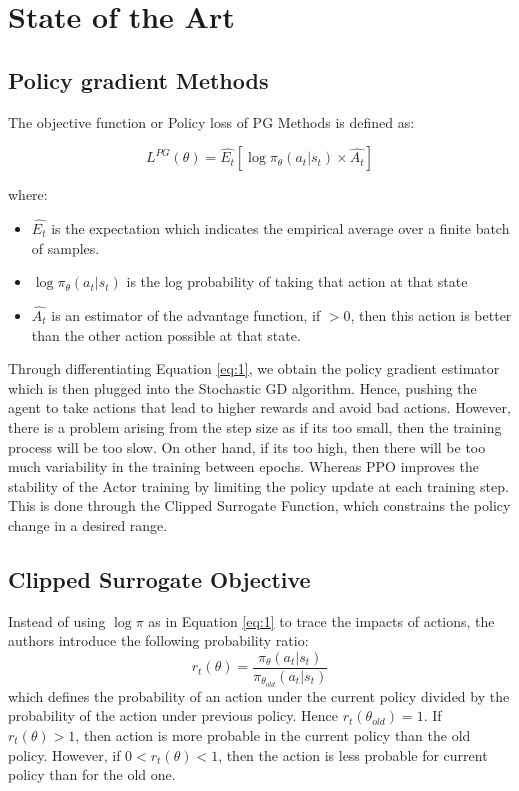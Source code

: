 \documentclass[12pt,a4paper]{article}
\begin{document}
\section{State of the Art}

\subsection{Policy gradient Methods}
The objective function or Policy loss of PG Methods is defined as: 


\begin{equation}
L^{PG}(\theta) =\hat{E_{t}} [\log \pi_{\theta} (a_t|s_t) \times \hat{{A_t}}  ] 
\end{equation}\label{eq:1}


where:
\begin{itemize}
\item  $\hat{{E_t}}$ is the expectation which indicates the empirical average over a finite batch of samples.
\item $\log \pi_{\theta} (a_t|s_t)$ is the log probability of taking that action at that state 
\item $\hat{{A_t}}$ is an estimator of the advantage function, if $>0$, then this action is better than the other action possible at that state.
\end{itemize}
Through differentiating Equation \ref{eq:1}, we obtain the policy gradient estimator which is then plugged into the Stochastic GD algorithm. Hence, pushing the agent to take actions that lead to higher rewards and avoid bad actions. However, there is a problem arising from the step size as if its too small, then the training process will be too slow. On other hand, if its too high, then there will be too much variability in the training between epochs.
Whereas PPO improves the stability of the Actor training by limiting the policy update at each training step. This is done through the Clipped Surrogate Function, which constrains the policy change in a desired range.

\subsection{Clipped Surrogate Objective}
Instead of using $\log \pi$ as in Equation \ref{eq:1} to trace the impacts of actions, the authors introduce the following probability ratio:
\begin{equation}
r_t (\theta) =\frac{\pi_{\theta}(a_t|s_t)}{ \pi_{\theta_{old}} (a_t|s_t) }
\end{equation}
which defines the probability of an action under the current policy divided by the probability of the action under previous policy. Hence $r_t(\theta_{old}) = 1$.\newline
If $r_t(\theta) > 1$, then action is more probable in the current policy than the old policy. However, if $0 < r_t(\theta) < 1$, then the action is less probable for current policy than for the old one.
\end{document}
